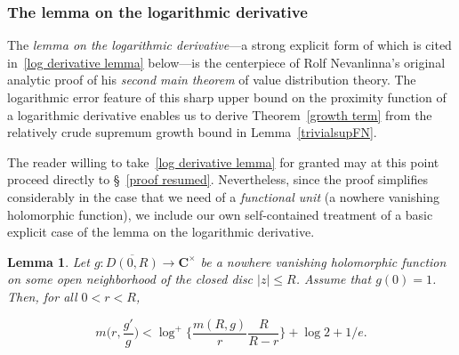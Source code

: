 \documentclass[10pt]{amsart}
\def\SSSS{\S}
\newtheorem{lemma}[subsubsection]{Lemma}
\theoremstyle{remark}
\numberwithin{equation}{subsection}
\def\numequation{\addtocounter{subsubsection}{1}\begin{equation}}
\def\C{\mathbf{C}}
\begin{document}
\subsubsection{The lemma on the logarithmic derivative}

The  {\it lemma on the logarithmic derivative}---a strong explicit form of which is cited in~\eqref{log derivative lemma} below---is the centerpiece of Rolf Nevanlinna's original analytic proof of his 
 \emph{second main theorem} of value distribution theory. The logarithmic error feature of this sharp upper bound on the proximity function of a logarithmic derivative enables us to derive Theorem~\ref{growth term} from the relatively crude supremum growth bound in Lemma~\ref{trivialsupFN}. 
 
 The  reader willing to take~\eqref{log derivative lemma} for granted may at this point proceed directly to \SSSS~\ref{proof resumed}. Nevertheless, since the proof simplifies considerably in the case that we need of a \emph{functional unit} (a nowhere vanishing holomorphic function), we include our own self-contained treatment of a basic explicit case of the lemma on the logarithmic derivative. 

 


\begin{lemma}  \label{log derivative self-contained}
Let $g : \overline{D(0,R)} \to \C^{\times}$ be a nowhere vanishing holomorphic function on some open neighborhood of the closed disc $|z| \leq R$. 
Assume that $g(0) = 1$. Then, for all $0 < r < R$,
\numequation \label{log derivatives are small}
m\Big(r , \frac{g'}{g}\Big) <  \log^+{\Big\{ \frac{m(R,g)}{r} \frac{R}{R-r} \Big\}}
+ \log{2} + 1/e.
\end{equation}
\end{lemma}
\end{document}
